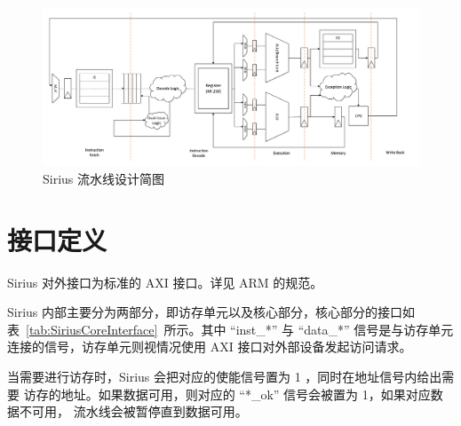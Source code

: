 \documentclass[blue,normal,cn,hide]{elegantbook}
\begin{document}
\begin{figure}[htpb]
    \centering
    \includegraphics[width=1.64\textwidth,angle=90]{figures/Sirius.pdf}
    \caption{Sirius 流水线设计简图}
    \label{fig:SiriusPipeline}
\end{figure}

\section{接口定义}

Sirius 对外接口为标准的 AXI 接口。详见 ARM 的规范。

Sirius 内部主要分为两部分，即访存单元以及核心部分，核心部分的接口如
表~\ref{tab:SiriusCoreInterface}~所示。其中 ``inst\_*'' 与 ``data\_*''
信号是与访存单元连接的信号，访存单元则视情况使用 AXI 接口对外部设备发起访问请求。

当需要进行访存时，Sirius 会把对应的使能信号置为 1 ，同时在地址信号内给出需要
访存的地址。如果数据可用，则对应的 ``*\_ok'' 信号会被置为 1，如果对应数据不可用，
流水线会被暂停直到数据可用。
\end{document}
